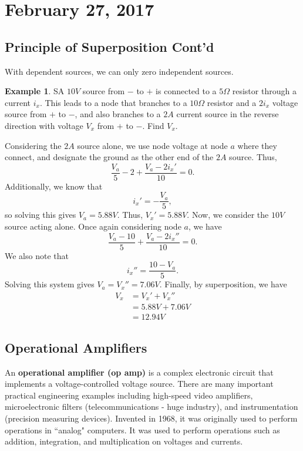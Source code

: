 \documentclass[11pt]{article}
\theoremstyle{plain} %
\theoremstyle{definition}
\theoremstyle{example}
\newtheorem*{example}{Example}
\theoremstyle{remark}
\begin{document}
\section{February 27, 2017}
\subsection{Principle of Superposition Cont'd}
With dependent sources, we can only zero independent sources. 

\begin{example}
SA $10V$ source from $-$ to $+$ is connected to a $5\Omega$ resistor through a current $i_x$. This leads to a node that branches to a $10\Omega$ resistor and a $2i_x$ voltage source from $+$ to $-$, and also branches to a $2A$ current source in the reverse direction with voltage $V_x$ from $+$ to $-$. Find $V_x$.
\end{example}

Considering the $2A$ source alone, we use node voltage at node $a$ where they connect, and designate the ground as the other end of the $2A$ source. Thus,
$$\frac{V_a}{5} - 2 + \frac{V_a -2i_x'}{10} = 0.$$
Additionally, we know that 
$$i_x' = -\frac{V_a}{5},$$
so solving this gives $V_a = 5.88V$. Thus, $V_x' = 5.88V$.
Now, we consider the $10V$ source acting alone. Once again considering node $a$, we have
$$\frac{V_a-10}{5} + \frac{V_a-2i_x''}{10} = 0.$$
We also note that 
$$i_x'' = \frac{10-V_a}{5}.$$
Solving this system gives $V_a = V_x'' = 7.06V.$
Finally, by superposition, we have 
\begin{align*}
V_x &= V_x' + V_x'' \\
&= 5.88V + 7.06V\\
&= 12.94V
\end{align*}

\subsection{Operational Amplifiers}
An \textbf{operational amplifier (op amp) }is a complex electronic circuit that implements a voltage-controlled voltage source. There are many important practical engineering examples including high-speed video amplifiers, microelectronic filters (telecommunications - huge industry), and instrumentation (precision measuring devices). Invented in 1968, it was originally used to perform operations in ``analog" computers. It was used to perform operations such as addition, integration, and multiplication on voltages and currents. 
\end{document}
